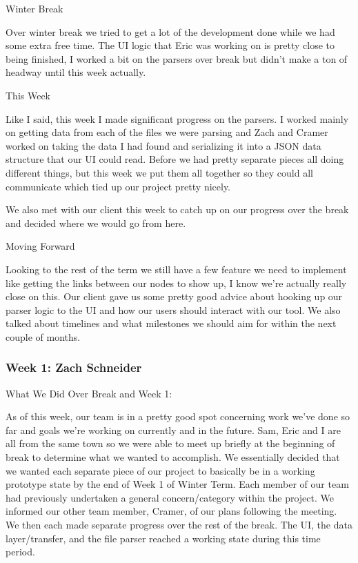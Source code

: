 Winter Break

Over winter break we tried to get a lot of the development done while we had some extra free time. The UI logic that Eric was working on is pretty close to being finished, I worked a bit on the parsers over break but didn't make a ton of headway until this week actually. 



This Week

Like I said, this week I made significant progress on the parsers. I worked mainly on getting data from each of the files we were parsing and Zach and Cramer worked on taking the data I had found and serializing it into a JSON data structure that our UI could read. Before we had pretty separate pieces all doing different things, but this week we put them all together so they could all communicate which tied up our project pretty nicely. 



We also met with our client this week to catch up on our progress over the break and decided where we would go from here.



Moving Forward

Looking to the rest of the term we still have a few feature we need to implement like getting the links between our nodes to show up, I know we're actually really close on this. Our client gave us some pretty good advice about hooking up our parser logic to the UI and how our users should interact with our tool. We also talked about timelines and what milestones we should aim for within the next couple of months. \\ 

 \subsubsection{Week 1: Zach Schneider}

What We Did Over Break and Week 1:

As of this week, our team is in a pretty good spot concerning work we've done so far and goals we're working on currently and in the future. Sam, Eric and I are all from the same town so we were able to meet up briefly at the beginning of break to determine what we wanted to accomplish. We essentially decided that we wanted each separate piece of our project to basically be in a working prototype state by the end of Week 1 of Winter Term. Each member of our team had previously undertaken a general concern/category within the project. We informed our other team member, Cramer, of our plans following the meeting. We then each made separate progress over the rest of the break. The UI, the data layer/transfer, and the file parser reached a working state during this time period.



